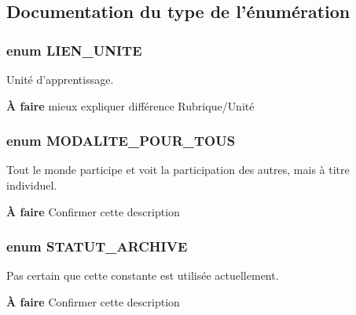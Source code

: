 \subsection{Documentation du type de l'énumération}
\subsubsection{\setlength{\rightskip}{0pt plus 5cm}enum {\bf LIEN\_\-UNITE}}\label{plate__forme_8class_8php_8e9eb37eca2ac544e3ca2971faaa4463}


Unité d'apprentissage. 

\begin{Desc}
\item[{\bf À faire}]mieux expliquer différence Rubrique/Unité \end{Desc}
\subsubsection{\setlength{\rightskip}{0pt plus 5cm}enum {\bf MODALITE\_\-POUR\_\-TOUS}}\label{plate__forme_8class_8php_bda97b80518494d3673623461fbb4ecb}


Tout le monde participe et voit la participation des autres, mais à titre individuel. 

\begin{Desc}
\item[{\bf À faire}]Confirmer cette description \end{Desc}
\subsubsection{\setlength{\rightskip}{0pt plus 5cm}enum {\bf STATUT\_\-ARCHIVE}}\label{plate__forme_8class_8php_76501146e29d32302e99e9e972f1f8b5}


Pas certain que cette constante est utilisée actuellement. 

\begin{Desc}
\item[{\bf À faire}]Confirmer cette description \end{Desc}


